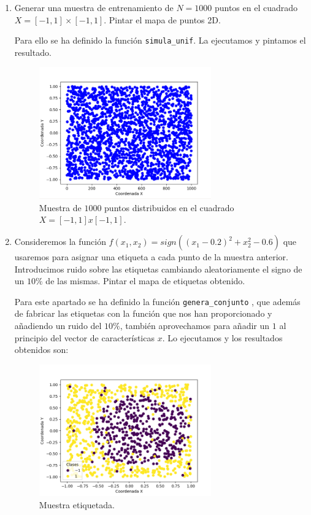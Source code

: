 \documentclass[size=a4, parskip=half, titlepage=false, toc=flat, toc=bib, 12pt]{scrartcl}
\begin{document}
\begin{enumerate}
\begin{enumerate}
\item Generar una muestra de entrenamiento de $N = 1000$ puntos en el cuadrado
$X = [−1, 1] × [−1, 1]$. Pintar el mapa de puntos 2D.

Para ello se ha definido la función \verb|simula_unif|. La ejecutamos y pintamos el resultado.

\begin{figure}[H]
\centering
\includegraphics[width=0.7\textwidth]{./img/ej23}
\caption{Muestra de $1000$ puntos distribuidos en el cuadrado $X = [-1,1]x[-1,1]$.}
\end{figure}

\item Consideremos la función $f (x_1 , x_2 ) = sign((x_1 − 0.2)^2 + x_2^2 − 0.6)$ que usaremos
para asignar una etiqueta a cada punto de la muestra anterior. Introducimos
ruido sobre las etiquetas cambiando aleatoriamente el signo de un $10 \%$ de las
mismas. Pintar el mapa de etiquetas obtenido.

Para este apartado se ha definido la función \verb|genera_conjunto| , que además de fabricar
las etiquetas con la función que nos han proporcionado y añadiendo un ruido del $10 \%$, también
aprovechamos para añadir un $1$ al principio del vector de características $x$. Lo ejecutamos
y los resultados obtenidos son:

\begin{figure}[H]
\centering
\includegraphics[width=0.7\textwidth]{./img/ej24}
\caption{Muestra etiquetada.}
\end{figure}


\end{enumerate}
\end{enumerate}
\end{document}
